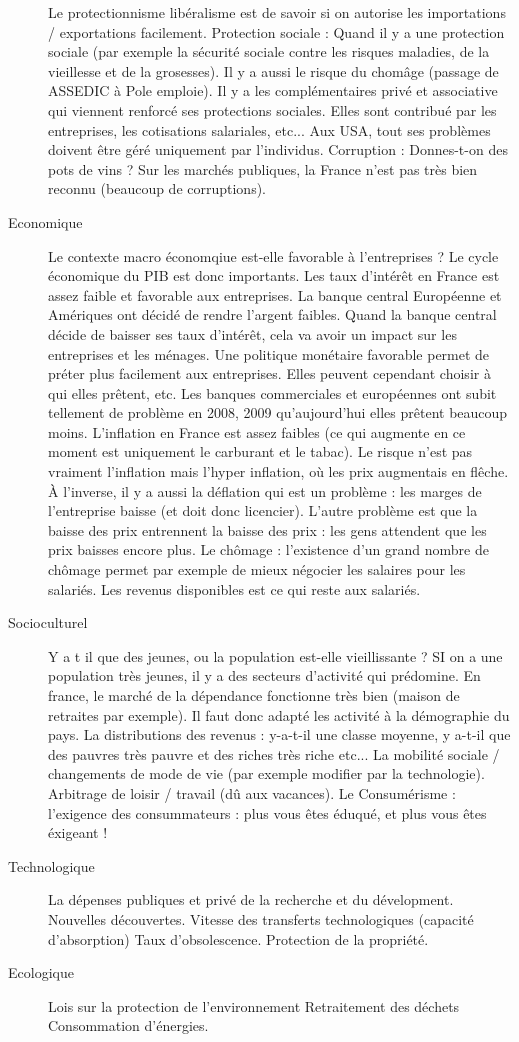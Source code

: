 \begin{description}
Le protectionnisme libéralisme est de savoir si on autorise les importations / exportations facilement.
Protection sociale : Quand il y a une protection sociale (par exemple la sécurité sociale contre les risques maladies, de la vieillesse et de la grosesses). Il y a aussi le risque du chomâge (passage de ASSEDIC à Pole emploie). Il y a les complémentaires privé et associative qui viennent renforcé ses protections sociales. Elles sont contribué par les entreprises, les cotisations salariales, etc... Aux USA, tout ses problèmes doivent être géré uniquement par l'individus.
Corruption : Donnes-t-on des pots de vins ? Sur les marchés publiques, la France n'est pas très bien reconnu (beaucoup de corruptions). 
	\item[Economique] Le contexte macro économqiue est-elle favorable à l'entreprises ? Le cycle économique du PIB est donc importants. 
Les taux d'intérêt en France est assez faible et favorable aux entreprises. La banque central Européenne et Amériques ont décidé de rendre l'argent faibles. Quand la banque central décide de baisser ses taux d'intérêt, cela va avoir un impact sur les entreprises et les ménages. Une politique monétaire favorable permet de préter plus facilement aux entreprises. Elles peuvent cependant choisir à qui elles prêtent, etc. Les banques commerciales et européennes ont subit tellement de problème en 2008, 2009 qu'aujourd'hui elles prêtent beaucoup moins.
L'inflation en France est assez faibles (ce qui augmente en ce moment est uniquement le carburant et le tabac). Le risque n'est pas vraiment l'inflation mais l'hyper inflation, où les prix augmentais en flêche. À l'inverse, il y a aussi la déflation qui est un problème : les marges de l'entreprise baisse (et doit donc licencier). L'autre problème est que la baisse des prix entrennent la baisse des prix : les gens attendent que les prix baisses encore plus.
Le chômage : l'existence d'un grand nombre de chômage permet par exemple de mieux négocier les salaires pour les salariés. Les revenus disponibles est ce qui reste aux salariés.
	\item[Socioculturel] Y a t il que des jeunes, ou la population est-elle vieillissante ? SI on a une population très jeunes, il y a des secteurs d'activité qui prédomine. En france, le marché de la dépendance fonctionne très bien (maison de retraites par exemple). Il faut donc adapté les activité à la démographie du pays.
La distributions des revenus : y-a-t-il une classe moyenne, y a-t-il que des pauvres très pauvre et des riches très riche etc...
La mobilité sociale / changements de mode de vie (par exemple modifier par la technologie).
Arbitrage de loisir / travail (dû aux vacances).
Le Consumérisme : l'exigence des consummateurs : plus vous êtes éduqué, et plus vous êtes éxigeant ! 
	\item[Technologique] La dépenses publiques et privé de la recherche et du dévelopment. 
		Nouvelles découvertes.
		Vitesse des transferts technologiques (capacité d'absorption)
		Taux d'obsolescence.
		Protection de la propriété.
	\item[Ecologique] Lois sur la protection de l'environnement
		Retraitement des déchets
		Consommation d'énergies.
\end{description}


